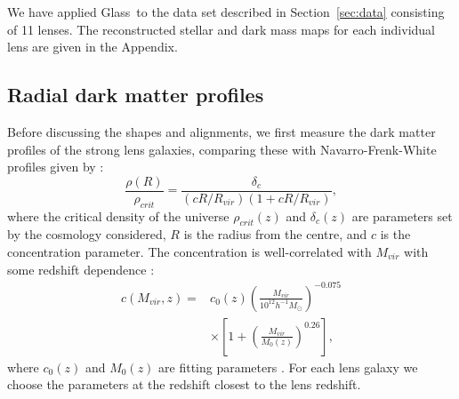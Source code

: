 \documentclass[useAMS,usenatbib]{mn2e}
\def\Glass{{\sc Glass}}
\begin{document}
We have applied \Glass\ to the data set described in Section~\ref{sec:data} consisting of 11 lenses. The reconstructed stellar and dark mass maps for each individual lens are given in the Appendix.

\subsection{Radial dark matter profiles}\label{sec:radialprofiles}
Before discussing the shapes and alignments, we first measure the dark matter profiles of the strong lens galaxies, comparing these with Navarro-Frenk-White profiles \citep[NFW;][]{1996ApJ...462..563N} given by \citep{2011ApJ...740..102K}:
\begin{equation}\label{eq:nfw}
   \frac{\rho(R)}{\rho_{crit}} = \frac{\delta_{c}}{(cR/R_{vir})(1+cR/R_{vir})},
\end{equation}
where the critical density of the universe $\rho_{crit}(z)$ and $\delta_{c}(z)$ are parameters set by the cosmology considered, $R$ is the radius from the centre, and $c$ is the concentration parameter. The concentration is well-correlated with $M_{vir}$ with some redshift dependence \citep{2011ApJ...740..102K}: 
\begin{equation}\label{eq:concentration}
 \begin{split}
   c(M_{vir}, z) = & c_{0}(z)\left(\frac{M_{vir}}{10^{12}h^{-1}M_{\odot}}\right)^{-0.075} \\ & \times \left[1+\left(\frac{M_{vir}}{M_{0}(z)}\right)^{0.26}\right],
 \end{split}
\end{equation}
where $c_{0}(z)$ and $M_{0}(z)$ are fitting parameters \citep[see Table 3 of][]{2011ApJ...740..102K}. For each lens galaxy we choose the parameters at the redshift closest to the lens redshift.
\end{document}
